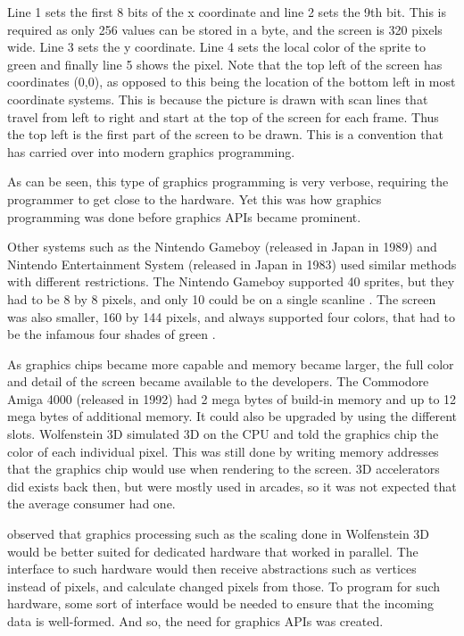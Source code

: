 Line 1 sets the first 8 bits of the x coordinate and line 2 sets the 9th bit.
This is required as only 256 values can be stored in a byte, and the screen is 320 pixels wide.
Line 3 sets the y coordinate.
Line 4 sets the local color of the sprite to green and finally line 5 shows the pixel.
Note that the top left of the screen has coordinates (0,0), as opposed to this being the location of the bottom left in most coordinate systems.
This is because the picture is drawn with scan lines that travel from left to right and start at the top of the screen for each frame. 
Thus the top left is the first part of the screen to be drawn. This is a convention that has carried over into modern graphics programming.


As can be seen, this type of graphics programming is very verbose, requiring the programmer to get close to the hardware. Yet this was how graphics programming was done before graphics \glspl{API} became prominent.

Other systems such as the Nintendo Gameboy (released in Japan in 1989) and Nintendo Entertainment System (released in Japan in 1983) used similar methods with different restrictions.
The Nintendo Gameboy supported 40 sprites, but they had to be 8 by 8 pixels, and only 10 could be on a single scanline \cite{nintendo1999gameboy}. 
The screen was also smaller, 160 by 144 pixels, and always supported four colors, that had to be the infamous four shades of green \cite{nintendo1999gameboy}.

As graphics chips became more capable and memory became larger, the full color and detail of the screen became available to the developers.
The Commodore Amiga 4000 (released in 1992) had 2 mega bytes of build-in memory and up to 12 mega bytes of additional memory.
It could also be upgraded by using the different slots.
Wolfenstein 3D simulated 3D on the \gls{CPU} and told the graphics chip the color of each individual pixel.
This was still done by writing memory addresses that the graphics chip would use when rendering to the screen.
3D accelerators did exists back then, but were mostly used in arcades, so it was not expected that the average consumer had one.

 observed that graphics processing such as the scaling done in Wolfenstein 3D would be better suited for dedicated hardware that worked in parallel. 
The interface to such hardware would then receive abstractions such as vertices instead of pixels, and calculate changed pixels from those.
To program for such hardware, some sort of interface would be needed to ensure that the incoming data is well-formed.
And so, the need for graphics \glspl{API} was created.

